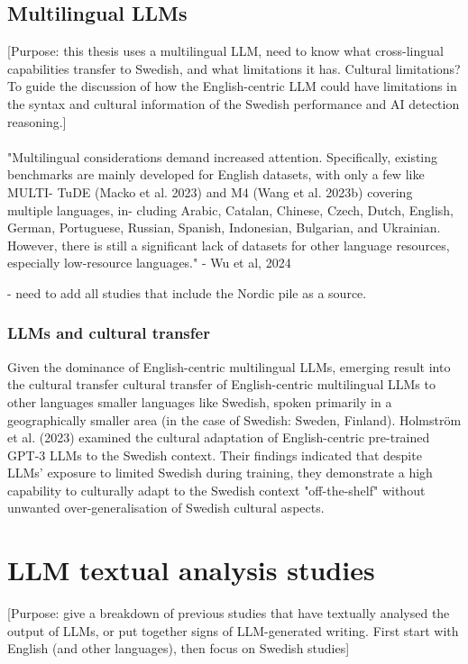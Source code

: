 \documentclass[thesis]{cluu}
\begin{document}
\subsection{Multilingual LLMs}
[Purpose: this thesis uses a multilingual LLM, need to know what cross-lingual capabilities transfer to Swedish, and what limitations it has. Cultural limitations? To guide the discussion of how the English-centric LLM could have limitations in the syntax and cultural information of the Swedish performance and AI detection reasoning.]
\paragraph{}
"Multilingual considerations demand increased attention. Specifically, existing
benchmarks are mainly developed for English datasets, with only a few like MULTI-
TuDE (Macko et al. 2023) and M4 (Wang et al. 2023b) covering multiple languages, in-
cluding Arabic, Catalan, Chinese, Czech, Dutch, English, German, Portuguese, Russian,
Spanish, Indonesian, Bulgarian, and Ukrainian. However, there is still a significant lack
of datasets for other language resources, especially low-resource languages." - Wu et al, 2024

- need to add all studies that include the Nordic pile as a source.

\subsubsection{LLMs and cultural transfer}
Given the dominance of English-centric multilingual LLMs, emerging result into the cultural transfer  cultural transfer of English-centric multilingual LLMs to other languages smaller languages like Swedish, spoken primarily in a geographically smaller area (in the case of Swedish: Sweden, Finland). Holmström et al. (2023) examined the cultural adaptation of English-centric pre-trained GPT-3 LLMs to the Swedish context. Their findings indicated that despite LLMs' exposure to limited Swedish during training, they demonstrate a high capability to culturally adapt to the Swedish context "off-the-shelf" without unwanted over-generalisation of Swedish cultural aspects.


\section{LLM textual analysis studies}
[Purpose: give a breakdown of previous studies that have textually analysed the output of LLMs, or put together signs of LLM-generated writing. First start with English (and other languages), then
focus on Swedish studies]
\end{document}
